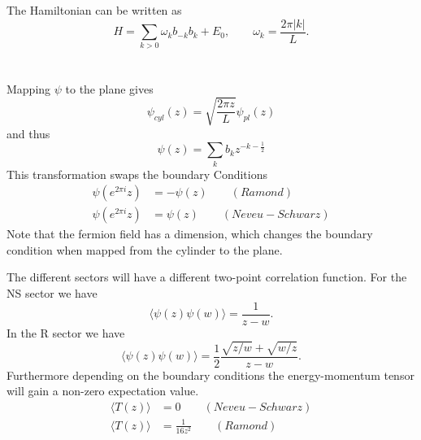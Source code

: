 \documentclass[submission, PhysLectNotes]{SciPost}
\begin{document}
The Hamiltonian can be written as
\begin{equation}
  H = \sum_{k>0} \omega_k b_{-k}b_k +E_0, \qquad \omega_k = \frac{2\pi\lvert k\rvert}{L}.
\end{equation}\\

\\
Mapping $\psi$ to the plane gives
\begin{equation}
  \psi_{cyl}(z) = \sqrt{\frac{2\pi z}{L}}\psi_{pl}(z)
\end{equation}
and thus
\begin{equation}
  \psi(z) = \sum_k b_k z^{-k-\frac{1}{2}}
\end{equation}
This transformation swaps the boundary Conditions
\begin{equation}
	\begin{aligned}
  		\psi(e^{2\pi i}z) &=-\psi(z) \qquad(Ramond)\\
  		\psi(e^{2\pi i}z) &=\psi(z) \qquad(Neveu-Schwarz)
	\end{aligned}
\end{equation}
Note that the fermion field has a dimension, which changes the boundary condition when mapped from the cylinder to the plane.

The different sectors will have a different two-point correlation function. For the NS sector we have
\begin{equation}
  \langle\psi(z)\psi(w)\rangle = \frac{1}{z-w}.
\end{equation}
In the R sector we have
\begin{equation}
  \langle\psi(z)\psi(w)\rangle = \frac{1}{2}\frac{\sqrt{z/w}+\sqrt{w/z}}{z-w}.
\end{equation}
Furthermore depending on the boundary conditions the energy-momentum tensor will gain a non-zero expectation value.
\begin{align}
  \langle T(z)\rangle &= 0 \qquad(Neveu-Schwarz)\\
  \langle T(z)\rangle &= \frac{1}{16z^2} \qquad(Ramond)
\end{align}\\
\end{document}
